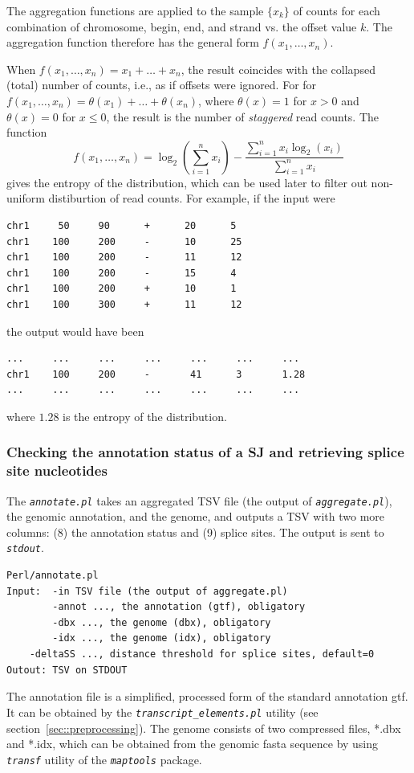 \documentclass{article}
\newcommand{\prog}[1]{{\tt\em #1}}
\begin{document}
The aggregation functions are applied to the sample $\{x_k\}$ of counts for each combination of chromosome, begin, end, and strand vs. the offset value $k$. 
The aggregation function therefore has the general form $f(x_1,\dots,x_n)$. 

When $f(x_1,\dots,x_n) = x_1+\dots+x_n$, the result coincides with the collapsed (total) number of counts, i.e., as if offsets were ignored.
For for $f(x_1,\dots,x_n) = \theta(x_1)+\dots+\theta(x_n)$, where $\theta(x)=1$ for $x>0$ and $\theta(x)=0$ for $x\le0$, the result is the 
number of {\em staggered} read counts. The function 
$$f(x_1,\dots,x_n) = \log_2(\sum\limits_{i=1}^nx_i) - \frac{\sum\limits_{i=1}^nx_i\log_2(x_i)}{\sum\limits_{i=1}^nx_i}$$ 
gives the entropy of the distribution, which can be used later to filter out non-uniform distiburtion of read counts. 
For example, if the input were
\begin{verbatim}
chr1     50     90      +      20      5
chr1    100     200     -      10      25
chr1    100     200     -      11      12
chr1    100     200     -      15      4
chr1    100     200     +      10      1
chr1    100     300     +      11      12
\end{verbatim}
the output would have been
\begin{verbatim}
...     ...     ...     ...     ...     ...     ...
chr1    100     200     -       41      3       1.28
...     ...     ...     ...     ...     ...     ...
\end{verbatim}
where $1.28$ is the entropy of the distribution.


\subsubsection[Annotation status and splice site nucleotides]{Checking the annotation status of a SJ and retrieving splice site nucleotides}
\label{sec::annotation_status}
The \prog{annotate.pl} takes an aggregated TSV file (the output of \prog{aggregate.pl}), the genomic annotation, and the genome, and outputs a TSV 
with two more columns: (8) the annotation status and (9) splice sites. The output is sent to \prog{stdout}.
\begin{verbatim}
Perl/annotate.pl
Input:  -in TSV file (the output of aggregate.pl)
        -annot ..., the annotation (gtf), obligatory
        -dbx ..., the genome (dbx), obligatory
        -idx ..., the genome (idx), obligatory
	-deltaSS ..., distance threshold for splice sites, default=0
Outout: TSV on STDOUT
\end{verbatim}
The annotation file is a simplified, processed form of the standard annotation gtf. It can be obtained by the \prog{transcript\_elements.pl} utility (see section~\ref{sec::preprocessing}).
The genome consists of two compressed files, *.dbx and *.idx, which can be obtained from the genomic fasta sequence by using \prog{transf} utility of the \prog{maptools} package. 
\end{document}
